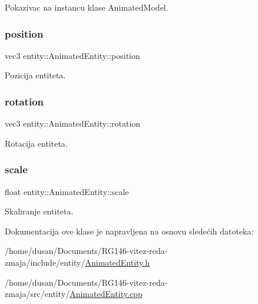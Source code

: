 Pokazivac na instancu klase Animated\+Model. 

\mbox{\label{classentity_1_1AnimatedEntity_ab02891959f4c1191807e267c48466230}} 
\subsubsection{\texorpdfstring{position}{position}}
{\footnotesize\ttfamily vec3 entity\+::\+Animated\+Entity\+::position\hspace{0.3cm}{\ttfamily [private]}}



Pozicija entiteta. 

\mbox{\label{classentity_1_1AnimatedEntity_a32f7718856950b74d40f4a96c1aa6f3d}} 
\subsubsection{\texorpdfstring{rotation}{rotation}}
{\footnotesize\ttfamily vec3 entity\+::\+Animated\+Entity\+::rotation\hspace{0.3cm}{\ttfamily [private]}}



Rotacija entiteta. 

\mbox{\label{classentity_1_1AnimatedEntity_a137e8fe0398142e9dedebb3eb1fe4f2f}} 
\subsubsection{\texorpdfstring{scale}{scale}}
{\footnotesize\ttfamily float entity\+::\+Animated\+Entity\+::scale\hspace{0.3cm}{\ttfamily [private]}}



Skaliranje entiteta. 



Dokumentacija ove klase je napravljena na osnovu sledećih datoteka\+:\begin{DoxyCompactItemize}
\item 
/home/dusan/\+Documents/\+R\+G146-\/vitez-\/reda-\/zmaja/include/entity/\hyperlink{AnimatedEntity_8h}{Animated\+Entity.\+h}\item 
/home/dusan/\+Documents/\+R\+G146-\/vitez-\/reda-\/zmaja/src/entity/\hyperlink{AnimatedEntity_8cpp}{Animated\+Entity.\+cpp}\end{DoxyCompactItemize}

